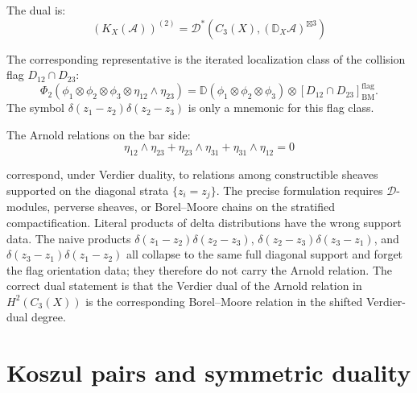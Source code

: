 \begin{computation}
The dual is:
\[(K_X(\mathcal A))^{(2)}
= \mathcal{D}^*(C_3(X),(\mathbb{D}_X\mathcal{A})^{\boxtimes 3})\]

The corresponding representative is the iterated localization class
of the collision flag $D_{12}\cap D_{23}$:
\[
\Phi_2(\phi_1 \otimes \phi_2 \otimes \phi_3 \otimes
\eta_{12} \wedge \eta_{23})
=
\mathbb{D}(\phi_1 \otimes \phi_2 \otimes \phi_3)
\otimes [D_{12}\cap D_{23}]_{\mathrm{BM}}^{\mathrm{flag}}.
\]
The symbol $\delta(z_1-z_2)\delta(z_2-z_3)$ is only a mnemonic for
this flag class.

The Arnold relations on the bar side:
\[\eta_{12} \wedge \eta_{23} + \eta_{23} \wedge \eta_{31} + \eta_{31} \wedge \eta_{12} = 0\]

correspond, under Verdier duality, to relations among constructible
sheaves supported on the diagonal strata $\{z_i=z_j\}$. The precise
formulation requires $\mathcal{D}$-modules, perverse sheaves, or
Borel--Moore chains on the stratified compactification. Literal
products of delta distributions have the wrong support data. The naive products
$\delta(z_1{-}z_2)\delta(z_2{-}z_3)$,
$\delta(z_2{-}z_3)\delta(z_3{-}z_1)$, and
$\delta(z_3{-}z_1)\delta(z_1{-}z_2)$ all collapse to the same full
diagonal support and forget the flag orientation data; they therefore
do not carry the Arnold relation. The correct dual statement is that
the Verdier dual of the Arnold relation in $H^2(C_3(X))$ is the
corresponding Borel--Moore relation in the shifted Verdier-dual
degree.
\end{computation}

\section{Koszul pairs and symmetric duality}

